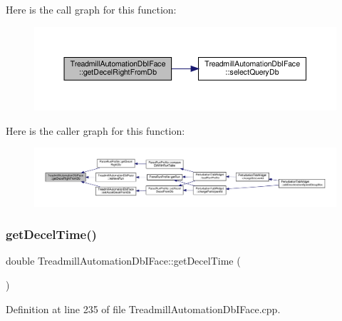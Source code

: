 Here is the call graph for this function\+:
\nopagebreak
\begin{figure}[H]
\begin{center}
\leavevmode
\includegraphics[width=350pt]{class_treadmill_automation_db_i_face_af989096b53ecd094660db2a1b08edae9_cgraph}
\end{center}
\end{figure}
Here is the caller graph for this function\+:
\nopagebreak
\begin{figure}[H]
\begin{center}
\leavevmode
\includegraphics[width=350pt]{class_treadmill_automation_db_i_face_af989096b53ecd094660db2a1b08edae9_icgraph}
\end{center}
\end{figure}
\mbox{\label{class_treadmill_automation_db_i_face_a7b8087febc0ab723b454d07c33f5aab0}} 
\subsubsection{\texorpdfstring{get\+Decel\+Time()}{getDecelTime()}}
{\footnotesize\ttfamily double Treadmill\+Automation\+Db\+I\+Face\+::get\+Decel\+Time (\begin{DoxyParamCaption}{ }\end{DoxyParamCaption})}



Definition at line 235 of file Treadmill\+Automation\+Db\+I\+Face.\+cpp.

